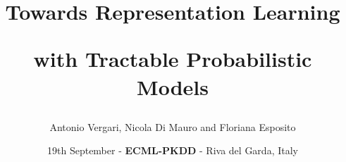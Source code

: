 \documentclass[xcolor={usenames,dvipsnames,svgnames}, compress]{beamer}
\begin{document}
\newlength{\custombulletheight}
\setlength{\custombulletheight}{\dimexpr0.5\ht1-0.5\ht2}

\title{Towards Representation Learning\par with Tractable Probabilistic Models}
\author{Antonio  Vergari, Nicola {Di Mauro} and Floriana Esposito}
\date{19th September - \textbf{ECML-PKDD} - Riva del Garda, Italy}


{
  \begin{frame}
    \titlepage
  \end{frame}
}
\end{document}

